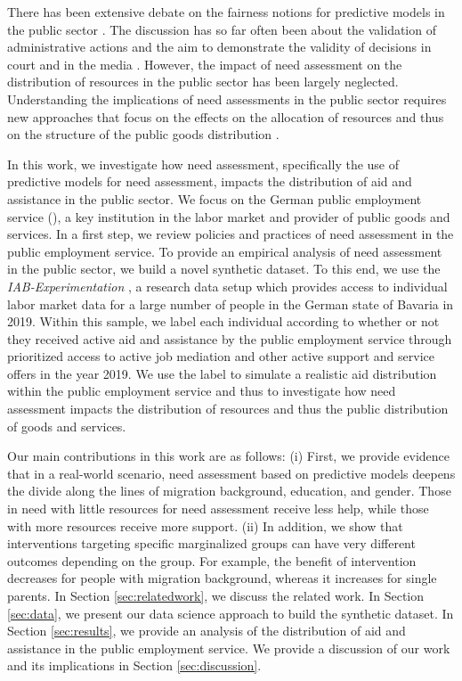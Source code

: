 \documentclass{article} %
\begin{document}
There has been extensive debate on the fairness notions for predictive models in the public sector \cite{barocas-hardt-narayanan,perdomo2023difficult}. The discussion has so far often been about the validation of administrative actions and the aim to demonstrate the validity of decisions in court and in the media \cite{Bach_Kern_Mautner_Kreuter_2023, wang2024}. However, the impact of need assessment on the distribution of resources in the public sector has been largely neglected. Understanding the implications of need assessments in the public sector requires new approaches that focus on the effects on the allocation of resources and thus on the structure of the public goods distribution \cite{kleinberg2015prediction}.

In this work, we investigate how need assessment, specifically the use of predictive models for need assessment, impacts the distribution of aid and assistance in the public sector. We focus on the German public employment service (\pshg), a key institution in the labor market and provider of public goods and services. In a first step, we review policies and practices of need assessment in the public employment service. To provide an empirical analysis of need assessment in the public sector, we build a novel synthetic dataset. To this end, we use the \emph{IAB-Experimentation} \cite{10.1145/3588001.3609369}, a research data setup which provides access to individual labor market data for a large number of people in the German state of Bavaria in 2019. Within this sample, we label each individual according to whether or not they received active aid and assistance by the public employment service through prioritized access to active job mediation and other active support and service offers in the year 2019. We use the label to simulate a realistic aid distribution within the public employment service and thus to investigate how need assessment impacts the distribution of resources and thus the public distribution of goods and services. 


Our main contributions in this work are as follows: (i) First, we provide evidence that in a real-world scenario, need assessment based on predictive models deepens the divide along the lines of migration background, education, and gender. Those in need with little resources for need assessment receive less help, while those with more resources receive more support. (ii) In addition, we show that interventions targeting specific marginalized groups can have very different outcomes depending on the group. For example, the benefit of intervention decreases for people with migration background, whereas it increases for single parents. In Section \ref{sec:relatedwork}, we discuss the related work. In Section \ref{sec:data}, we present our data science approach to build the synthetic dataset. In Section \ref{sec:results}, we provide an analysis of the distribution of aid and assistance in the public employment service. We provide a discussion of our work and its implications in Section \ref{sec:discussion}.
\end{document}
